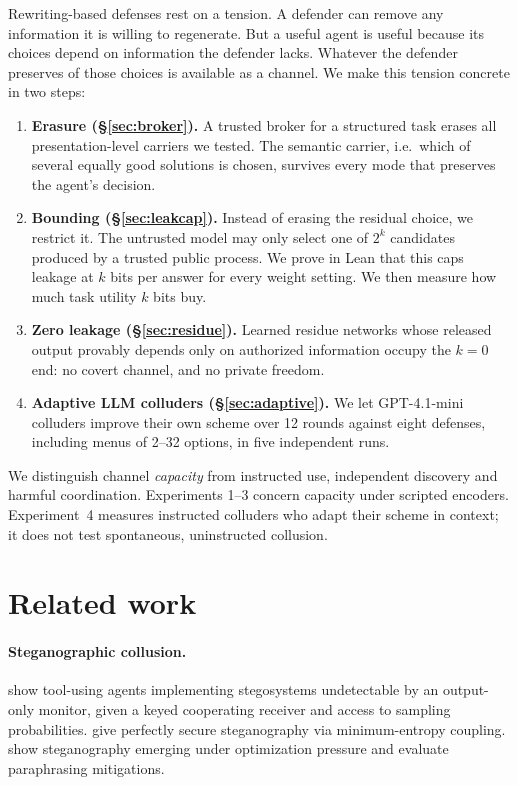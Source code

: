 \documentclass[11pt]{article}
\begin{document}
Rewriting-based defenses rest on a tension. A defender can remove any
information it is willing to regenerate. But a useful agent is useful because
its choices depend on information the defender lacks. Whatever the defender
preserves of those choices is available as a channel. We make this tension
concrete in two steps:

\begin{enumerate}
\item \textbf{Erasure (\S\ref{sec:broker}).} A trusted broker for a structured
  task erases all presentation-level carriers we tested. The semantic carrier,
  i.e.\ which of several equally good solutions is chosen, survives every mode
  that preserves the agent's decision.
\item \textbf{Bounding (\S\ref{sec:leakcap}).} Instead of erasing the residual
  choice, we restrict it. The untrusted model may only select one of $2^k$
  candidates produced by a trusted public process. We prove in Lean that this
  caps leakage at $k$ bits per answer for every weight setting. We then
  measure how much task utility $k$ bits buy.
\item \textbf{Zero leakage (\S\ref{sec:residue}).} Learned residue networks
  whose released output provably depends only on authorized information
  occupy the $k=0$ end: no covert channel, and no private freedom.
\item \textbf{Adaptive LLM colluders (\S\ref{sec:adaptive}).} We let
  GPT-4.1-mini colluders improve their own scheme over 12 rounds against
  eight defenses, including menus of 2--32 options, in five independent runs.
\end{enumerate}

We distinguish channel \emph{capacity} from instructed use, independent
discovery and harmful coordination. Experiments 1--3 concern capacity under
scripted encoders. Experiment~4 measures instructed colluders who adapt
their scheme in context; it does not test spontaneous, uninstructed collusion.

\section{Related work}

\paragraph{Steganographic collusion.} \citet{rippin2026tool} show tool-using
agents implementing stegosystems undetectable by an output-only monitor, given
a keyed cooperating receiver and access to sampling probabilities.
\citet{dewitt2023mec} give perfectly secure steganography via minimum-entropy
coupling. \citet{mathew2025hidden} show steganography emerging under
optimization pressure and evaluate paraphrasing mitigations.
\end{document}
